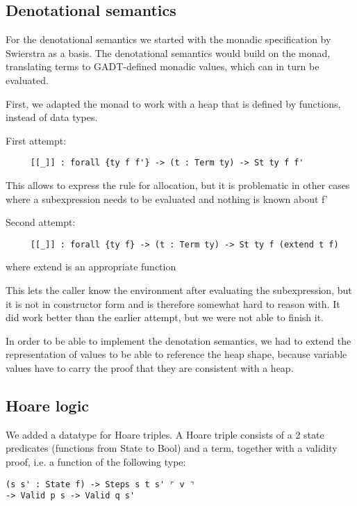 \documentclass{article}
\begin{document}
\subsection{Denotational semantics} %

For the denotational semantics we started with the monadic
specification by Swierstra as a basis. The denotational semantics
would build on the monad, translating terms to GADT-defined monadic
values, which can in turn be evaluated.

First, we adapted the monad to work with a heap that is defined by
functions, instead of data types.

First attempt:

\begin{lstlisting}
     [[_]] : forall {ty f f'} -> (t : Term ty) -> St ty f f'
\end{lstlisting}

This allows to express the rule for allocation, but it is problematic
in other cases where a subexpression needs to be evaluated and
nothing is known about f'

Second attempt:

\begin{lstlisting}
     [[_]] : forall {ty f} -> (t : Term ty) -> St ty f (extend t f)
\end{lstlisting}
where extend is an appropriate function

This lets the caller know the environment after evaluating the
subexpression, but it is not in constructor form and is therefore
somewhat hard to reason with. It did work better than the earlier
attempt, but we were not able to finish it.

In order to be able to implement the denotation semantics, we had to
extend the representation of values to be able to reference the heap
shape, because variable values have to carry the proof that they are
consistent with a heap.

\subsection{Hoare logic}

We added a datatype for Hoare triples. A Hoare triple consists of a 2 state predicates (functions from State to Bool) and a term, together with a validity proof, i.e. a function of the following type:

\begin{lstlisting}
(s s' : State f) -> Steps s t s' ⌜ v ⌝
-> Valid p s -> Valid q s'
\end{lstlisting}
\end{document}
